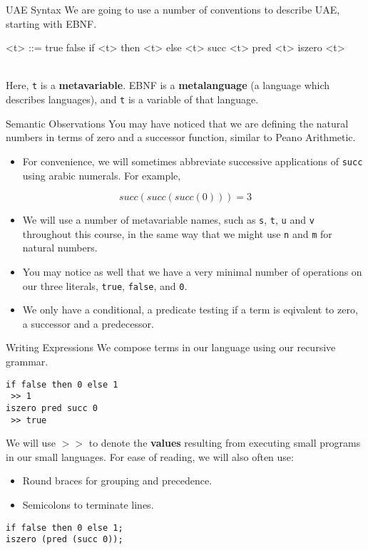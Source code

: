 \documentclass[11pt]{beamer}
\begin{document}
\begin{frame}[fragile=singleslide]{UAE Syntax}
We are going to use a number of conventions to describe UAE, starting with EBNF. \\
\dotfill
\begin{grammar}
<t> ::= true
\alt false
\alt if <t> then <t> else <t>
\alt succ <t>
\alt pred <t>
\alt iszero <t>
\end{grammar}
\dotfill \\
Here, \texttt{t} is a \textbf{metavariable}.  EBNF is a \textbf{metalanguage} (a language which describes languages), and \texttt{t} is a variable of that language.
\end{frame}

\begin{frame}[fragile=singleslide]{Semantic Observations}
You may have noticed that we are defining the natural numbers in terms of zero and a successor function, similar to Peano Arithmetic.  
\begin{itemize}
\item For convenience, we will sometimes abbreviate successive applications of \texttt{succ} using arabic numerals. For example,
\end{itemize}
\begin{equation}
succ(succ(succ(0))) = 3
\end{equation}
\begin{itemize}
\item We will use a number of metavariable names, such as \texttt{s}, \texttt{t}, \texttt{u} and \texttt{v} throughout this course, in the same way that we might use \texttt{n} and \texttt{m} for natural numbers.  
\item You may notice as well that we have a very minimal number of operations on our three literals, \texttt{true}, \texttt{false}, and \texttt{0}.
\item We only have a conditional, a predicate testing if a term is eqivalent to zero, a successor and a predecessor.  
\end{itemize}
\end{frame}

\begin{frame}[fragile=singleslide]{Writing Expressions}
We compose terms in our language using our recursive grammar.
\begin{lstlisting}[style=C]
if false then 0 else 1
 >> 1
iszero pred succ 0
 >> true
\end{lstlisting}
We will use $>>$ to denote the \textbf{values} resulting from executing small programs in our small languages.  For ease of reading, we will also often use:
\begin{itemize}
\item Round braces for grouping and precedence.
\item Semicolons to terminate lines.
\end{itemize}
\begin{lstlisting}[style=C]
if false then 0 else 1;
iszero (pred (succ 0));
\end{lstlisting}
\end{frame}
\end{document}

